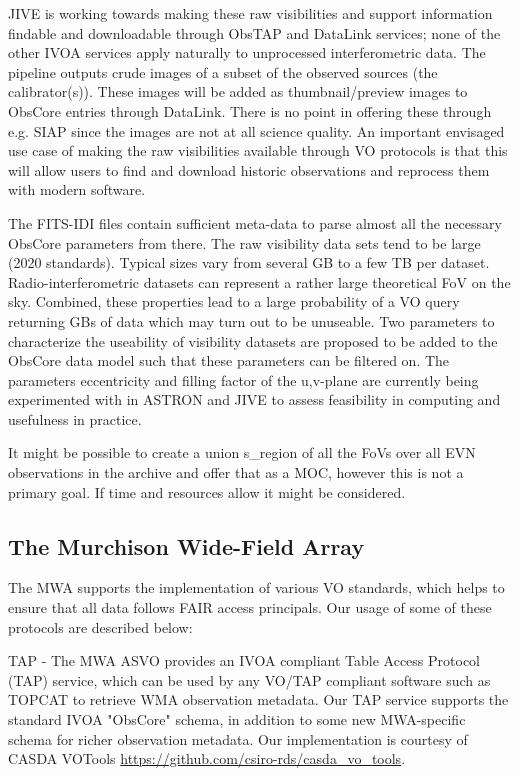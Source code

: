 \documentclass[11pt,a4paper]{ivoa}
\begin{document}
JIVE is working towards making these raw visibilities and support information findable and downloadable through ObsTAP and DataLink services; none of the other IVOA services apply naturally to unprocessed interferometric data. The pipeline outputs crude images of a subset of the observed sources (the calibrator(s)). These images will be added as thumbnail/preview images to ObsCore entries through DataLink. There is no point in offering these through e.g. SIAP since the images are not at all science quality. An important envisaged use case of making the raw visibilities available through VO protocols is that this will allow users to find and download historic observations and reprocess them with modern software.

The FITS-IDI files contain sufficient meta-data to parse almost all the necessary ObsCore parameters from there. The raw visibility data sets tend to be large (2020 standards). Typical sizes vary from several GB to a few TB per dataset. Radio-interferometric datasets can represent a rather large theoretical FoV on the sky. Combined, these properties lead to a large probability of a VO query returning GBs of data which may turn out to be unuseable. Two parameters to characterize the useability of visibility datasets are proposed to be added to the ObsCore data model such that these parameters can be filtered on. The parameters eccentricity and filling factor of the u,v-plane are currently being experimented with in ASTRON and JIVE to assess feasibility in computing and usefulness in practice.

It might be possible to create a union s\_region of all the FoVs over all EVN observations in the archive and offer that as a MOC, however this is not a primary goal. If time and resources allow it might be considered.

\subsection{The Murchison Wide-Field Array}
\label{sec:MWA}
The MWA supports the implementation of various VO standards, which helps to ensure that all data follows FAIR access principals. Our usage of some of these protocols are described below:

TAP - The MWA ASVO provides an IVOA compliant Table Access Protocol (TAP) service, which can be used by any VO/TAP compliant software such as TOPCAT to retrieve WMA observation metadata. Our TAP service supports the standard IVOA "ObsCore" schema, in addition to some new MWA-specific schema for richer observation metadata. Our implementation is courtesy of CASDA VOTools \url{https://github.com/csiro-rds/casda_vo_tools}.
\end{document}
